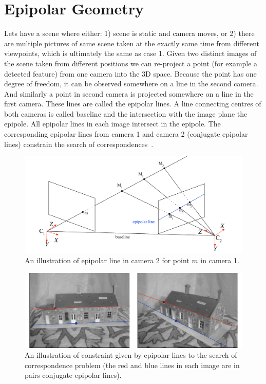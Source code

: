 \section{Epipolar Geometry}
Lets have a scene where either: 1) scene is static and camera moves, or 2) there are multiple pictures of same scene taken at the exactly same time from different viewpoints, which is ultimately the same as case 1. Given two distinct images of the scene taken from different positions we can re-project a point (for example a detected feature) from one camera into the 3D space. Because the point has one degree of freedom, it can be observed somewhere on a line in the second camera. And similarly a point in second camera is projected somewhere on a line in the first camera. These lines are called the epipolar lines. A line connecting centres of both cameras is called baseline and the intersection with the image plane the epipole. All epipolar lines in each image intersect in the epipole. The corresponding epipolar lines from camera 1 and camera 2 (conjugate epipolar lines) constrain the search of correspondences~\cite{book:multiple_view_geometry}.

\begin{figure}[!htbp]
	\begin{center}
		\includegraphics[keepaspectratio,width=\textwidth]{fig/epipolar-lines.pdf}
	\end{center}
	\caption{An illustration of epipolar line in camera 2 for point $m$ in camera 1.}
	\label{fig:epipolar-lines}
\end{figure}

\begin{figure}[!htbp]
	\begin{center}
		\includegraphics[keepaspectratio,width=\textwidth]{fig/epipolar-lines2.pdf}
	\end{center}
	\caption{An illustration of constraint given by epipolar lines to the search of correspondence problem (the red and blue lines in each image are in pairs conjugate epipolar lines).}
	\label{fig:epipolar-lines2}
\end{figure}

